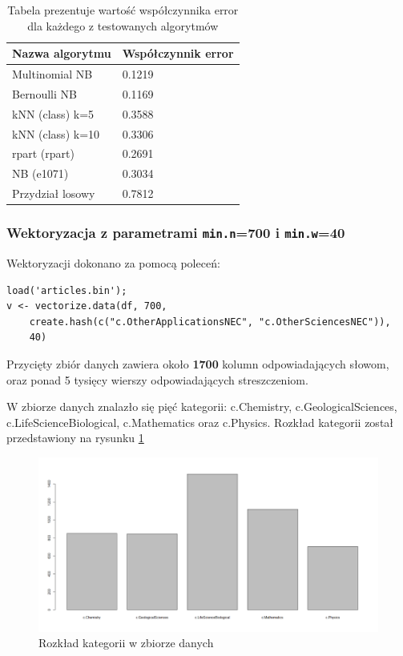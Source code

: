 \documentclass[a4paper,12pt]{article}
\begin{document}
		 \begin{table}	
		 	\centering	 	
		 	\begin{tabular}{|l|l|}
		 		\hline
		 		Nazwa algorytmu & Współczynnik error \\
		 		\hline
		 			Multinomial NB & 0.1219 \\
		 			Bernoulli NB & 0.1169 \\
		 		\hline
		 			kNN (class) k=5 & 0.3588 \\
		 			kNN (class) k=10 & 0.3306 \\
		 			rpart (rpart) & 0.2691 \\
					NB (e1071) & 0.3034 \\	
				\hline
					Przydział losowy & 	0.7812 \\ 			
		 		\hline
		 	\end{tabular}
		 	\caption{Tabela prezentuje wartość współczynnika error dla
		 	każdego z testowanych algorytmów}
		 \end{table}
		 
		 \clearpage
		 \newpage
		 
		 \subsubsection{Wektoryzacja z parametrami \texttt{min.n}=700 i
		 \texttt{min.w}=40}
		 
		 Wektoryzacji dokonano za pomocą poleceń:
		 \begin{verbatim}
load('articles.bin');
v <- vectorize.data(df, 700, 
	create.hash(c("c.OtherApplicationsNEC", "c.OtherSciencesNEC")),
	40) 
		 \end{verbatim}
		 
		 Przycięty zbiór danych zawiera około \textbf{1700} kolumn odpowiadających
		 słowom,
		 oraz ponad 5 tysięcy wierszy odpowiadających streszczeniom.
		 
		 W zbiorze danych znalazło się pięć kategorii: c.Chemistry, 		 
		 c.GeologicalSciences, c.LifeScienceBiological, c.Mathematics
		 oraz c.Physics. Rozkład kategorii został przedstawiony na 
		 rysunku \ref{fig:v2hist}
		 \begin{figure}[!h]
		 	\centering
		 		\includegraphics[width=\textwidth]{./img/v2_cats}
		 	\caption{Rozkład kategorii w zbiorze danych}
		 	\label{fig:v2hist}
		 \end{figure}
		 
\end{document}
